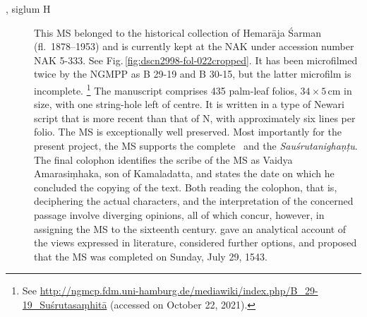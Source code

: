 \begin{description}
    \goodbreak \item[\MS{Kathmandu NAK 5-333}, siglum H]  This MS belonged to the
    historical collection of Hemarāja Śarman (fl.\ 1878--1953) and is currently
    kept at the NAK under accession number NAK 5-333. See
    Fig.\,\ref{fig:dscn2998-fol-022cropped}. It has been microfilmed twice by the
    NGMPP as B 29-19 and B 30-15, but the latter microfilm is incomplete.%
    \footnote{%
    See 
    \url{http://ngmcp.fdm.uni-hamburg.de/mediawiki/index.php/B_29-19_Suśrutasaṃhitā} 
    (accessed on October 22, 2021). } The manuscript comprises 435 palm-leaf folios, 
    $34\times5$\,cm in size, with one string-hole left of centre. It is written in a type of 
    Newari script that is more recent than that of N, with approximately six lines per 
    folio. The MS is exceptionally well preserved.  Most importantly for the present 
    project, the MS supports the complete \SS\ and the \emph{Sauśrutanighaṇṭu}. The 
    final colophon identifies the scribe of the MS as Vaidya Amarasiṃhaka, son of 
    Kamaladatta, and states the date on which he concluded the copying of the text. 
    Both reading the colophon, that is, deciphering the actual characters, and the 
    interpretation of the concerned passage involve diverging opinions, all of which 
    concur, however, in assigning the MS to the sixteenth century. 
    \textcite[21--26]{kleb-2021b} gave an analytical account of the views expressed in 
    literature, considered further options, and proposed that the MS was completed on 
    Sunday, July 29, 1543.
\end{description}
%  

